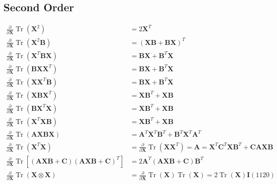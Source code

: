 \subsection{Second Order}


$$
\begin{aligned}
\frac{\partial}{\partial \mathbf{X}} \operatorname{Tr}\left(\mathbf{X}^{2}\right) &=2 \mathbf{X}^{T} \\
\frac{\partial}{\partial \mathbf{X}} \operatorname{Tr}\left(\mathbf{X}^{2} \mathbf{B}\right) &=(\mathbf{X B}+\mathbf{B X})^{T} \\
\frac{\partial}{\partial \mathbf{X}} \operatorname{Tr}\left(\mathbf{X}^{T} \mathbf{B} \mathbf{X}\right) &=\mathbf{B X}+\mathbf{B}^{T} \mathbf{X} \\
\frac{\partial}{\partial \mathbf{X}} \operatorname{Tr}\left(\mathbf{B X X}^{T}\right) &=\mathbf{B X}+\mathbf{B}^{T} \mathbf{X} \\
\frac{\partial}{\partial \mathbf{X}} \operatorname{Tr}\left(\mathbf{X} \mathbf{X}^{T} \mathbf{B}\right) &=\mathbf{B X}+\mathbf{B}^{T} \mathbf{X} \\
\frac{\partial}{\partial \mathbf{X}} \operatorname{Tr}\left(\mathbf{X B X}^{T}\right) &=\mathbf{X B}^{T}+\mathbf{X B} \\
\frac{\partial}{\partial \mathbf{X}} \operatorname{Tr}\left(\mathbf{B X}^{T} \mathbf{X}\right) &=\mathbf{X B}^{T}+\mathbf{X B} \\
\frac{\partial}{\partial \mathbf{X}} \operatorname{Tr}\left(\mathbf{X}^{T} \mathbf{X B}\right) &=\mathbf{X B}^{T}+\mathbf{X B} \\
\frac{\partial}{\partial \mathbf{X}} \operatorname{Tr}(\mathbf{A X B X}) &=\mathbf{A}^{T} \mathbf{X}^{T} \mathbf{B}^{T}+\mathbf{B}^{T} \mathbf{X}^{T} \mathbf{A}^{T} \\
\frac{\partial}{\partial \mathbf{X}} \operatorname{Tr}\left(\mathbf{X}^{T} \mathbf{X}\right) &=\frac{\partial}{\partial \mathbf{X}} \operatorname{Tr}\left(\mathbf{X X}^{T}\right)=\mathbf{A}=\mathbf{X}^{T} \mathbf{C}^{T} \mathbf{X B}^{T}+\mathbf{C A X B} \\
\frac{\partial}{\partial \mathbf{X}} \operatorname{Tr}\left[(\mathbf{A X B}+\mathbf{C})(\mathbf{A X B}+\mathbf{C})^{T}\right] &=2 \mathbf{A}^{T}(\mathbf{A X B}+\mathbf{C}) \mathbf{B}^{T} \\
\frac{\partial}{\partial \mathbf{X}} \operatorname{Tr}(\mathbf{X} \otimes \mathbf{X}) &=\frac{\partial}{\partial \mathbf{X}} \operatorname{Tr}(\mathbf{X}) \operatorname{Tr}(\mathbf{X})=2 \operatorname{Tr}(\mathbf{X}) \mathbf{I}(1120)
\end{aligned}
$$

